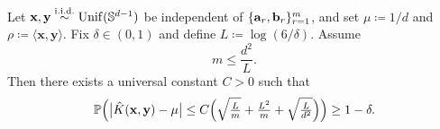 \begin{lemma}\label{lem:chaos-centered-mu}
Let $\mathbf{x},\mathbf{y} \stackrel{\mathrm{i.i.d.}}{\sim} \mathrm{Unif}(\mathbb{S}^{d-1})$ be independent of $\{{\mathbf{a}}_{r},{\mathbf{b}}_{r}\}_{r=1}^m$, and set $\mu \coloneqq 1/d$ and $\rho\coloneqq \langle \mathbf{x},\mathbf{y}\rangle$.
Fix $\delta\in(0,1)$ and define $L \coloneqq \log(6/\delta)$.
Assume
\begin{equation}\label{eq:m-assumption}
    m \le \frac{d^2}{L}.
\end{equation}
Then there exists a universal constant $C>0$ such that
\[
    \mathbb{P}\Big(
        \big|\hat K(\mathbf{x},\mathbf{y}) - \mu\big|
        \le
        C\Big(
            \sqrt{\tfrac{L}{m}} + \tfrac{L^2}{m} + \sqrt{\tfrac{L}{d^2}}
        \Big)
    \Big)
    \ge 1-\delta.
\]
\end{lemma}
